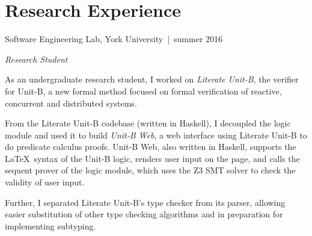 \documentclass[12pt,letterpaper]{article}
\renewenvironment{itemize}{
  \begin{list}{}{
    \setlength{\leftmargin}{1.5em}
    \setlength{\itemsep}{0.25em}
    \setlength{\parskip}{0pt}
    \setlength{\parsep}{0.25em}
  }
}{
  \end{list}
}
\begin{document}
\section*{Research Experience}

\begin{itemize}
\item {\large Software Engineering Lab, } York University\, |\, {\small summer 2016}

  \textit{Research Student}

  \begin{itemize}
  \item As an undergraduate research student, I worked on \textit{Literate
      Unit-B}, the verifier for Unit-B, a new formal method focused on formal
    verification of reactive, concurrent and distributed systems.

    From the Literate Unit-B codebase (written in Haskell), I decoupled the
    logic module and used it to build \textit{Unit-B Web}, a web interface using
    Literate Unit-B to do predicate calculus proofs. \linebreak Unit-B Web, also
    written in Haskell, supports the \LaTeX\ syntax of the Unit-B logic, renders
    user input on the page, and calls the sequent prover of the logic module,
    which uses the Z3 SMT solver to check the validity of user input.

  \item Further, I separated Literate Unit-B's type checker from its parser,
    allowing easier substitution of other type checking algorithms and in
    preparation for implementing subtyping.
  \end{itemize}
  \end{itemize}
\end{document}
